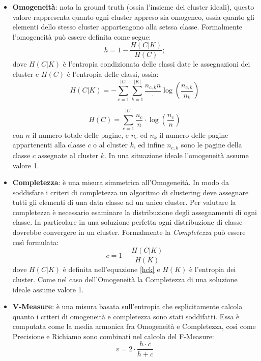 \begin{itemize}
\item \textbf{Omogeneità}: nota la ground truth (ossia l'insieme dei cluster ideali), questo valore rappresenta quanto ogni cluster appreso sia omogeneo,
ossia quanto gli elementi dello stesso cluster appartengono alla setssa classe.
Formalmente l'omogeneità può essere definita come segue:
\begin{equation}
h = 1 - \frac{H(C|K)}{H(C)};
\end{equation}
dove $H(C|K)$ è l'entropia condizionata delle classi date le assegnazioni dei cluster e $H(C)$ è l'entropia delle classi, ossia:
\begin{equation}
H(C|K) = - \sum\limits_{c=1}^{|C|} \sum\limits_{k=1}^{|K|} \frac{n_{c,k}{n}} \cdot \log \left( \frac{n_{c,k}}{n_k}\right)
\end{equation}
\label{hck}

\begin{equation}
H(C) = \sum\limits_{c=1}^{|C|} \frac{n_c}{n} \cdot \log \left( \frac{n_{c}}{n}\right)
\end{equation}
\label{hc}
con $n$ il numero totale delle pagine, e $n_c$ ed $n_k$ il numero delle pagine appartenenti alla classe $c$ o al cluster $k$, ed infine $n_{c,k}$ sono le pagine della classe $c$ assegnate al cluster $k$. In una situazione ideale l'omogeneità assume valore 1.  \cite{Rosenberg07}
\item \textbf{Completezza}: è una misura simmetrica all'Omogeneità. In modo da soddisfare i criteri di completezza un algoritmo di clustering deve assegnare tutti gli elementi di una data classe ad un unico cluster. Per valutare la completezza è necessario esaminare la distribuzione degli assegnamenti di ogni classe. In particolare in una soluzione perfetta ogni distribuzione di classe dovrebbe convergere in un cluster.
Formalmente la \textit{Completezza} può essere così formulata:
\begin{equation}
c = 1 - \frac{H(C|K)}{H(K)}
\end{equation}
dove $H(C|K)$ è definita nell'equazione \ref{hck} e $H(K)$ è l'entropia dei cluster. Come nel caso dell'Omogeneità la Completezza di una soluzione ideale assume valore 1.
\item \textbf{V-Measure}: è una misura basata sull'entropia che esplicitamente calcola quanto i criteri di omogeneità e completezza sono stati soddifatti. Essa è computata come la media armonica fra Omogeneità e Completezza, così come Precisione e Richiamo sono combinati nel calcolo del F-Measure:
\begin{equation}
v = 2 \cdot \frac{h \cdot c}{h + c}
\end{equation}


\end{itemize}
